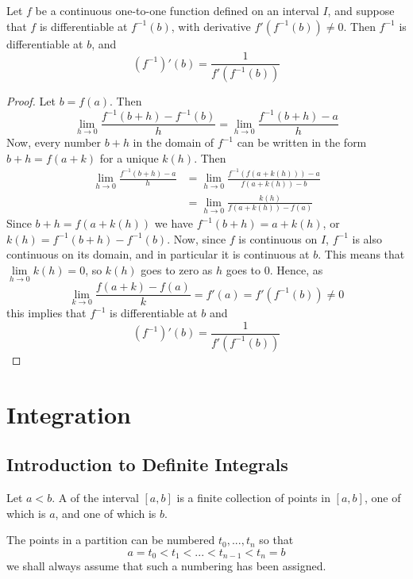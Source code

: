 \documentclass[12pt, a4paper, oneside, openright, titlepage]{book}
\begin{document}
\begin{thm}
    Let $f$ be a continuous one-to-one function defined on an interval $I$, and suppose that $f$ is differentiable at $f^{-1}(b)$, with derivative $f'(f^{-1}(b)) \neq 0$. Then $f^{-1}$ is differentiable at $b$, and \begin{equation}
        (f^{-1})'(b) = \frac{1}{f'(f^{-1}(b))}
    \end{equation}
\end{thm}
\begin{proof}
    Let $b = f(a)$. Then \begin{equation*}
        \lim\limits_{h\rightarrow 0}\frac{f^{-1}(b+h)-f^{-1}(b)}{h} = \lim\limits_{h\rightarrow 0}\frac{f^{-1}(b+h) - a}{h}
    \end{equation*}
    Now, every number $b+h$ in the domain of $f^{-1}$ can be written in the form $b+h = f(a+k)$ for a unique $k(h)$. Then \begin{align*}
        \lim\limits_{h\rightarrow 0}\frac{f^{-1}(b+h) - a}{h} &= \lim\limits_{h\rightarrow 0}\frac{f^{-1}(f(a+k(h)))-a}{f(a+k(h))-b} \\
        &= \lim\limits_{h\rightarrow 0}\frac{k(h)}{f(a+k(h))-f(a)}
    \end{align*}
    Since $b+h = f(a+k(h))$ we have $f^{-1}(b+h) = a+k(h)$, or $k(h) = f^{-1}(b+h)-f^{-1}(b)$. Now, since $f$ is continuous on $I$, $f^{-1}$ is also continuous on its domain, and in particular it is continuous at $b$. This means that $\lim\limits_{h\rightarrow 0}k(h) = 0$, so $k(h)$ goes to zero as $h$ goes to $0$. Hence, as $$\lim\limits_{k\rightarrow 0}\frac{f(a+k)-f(a)}{k} = f'(a) = f'(f^{-1}(b)) \neq 0$$ this implies that $f^{-1}$ is differentiable at $b$ and \begin{equation*}
        (f^{-1})'(b) = \frac{1}{f'(f^{-1}(b))}
    \end{equation*}
\end{proof}






\chapter{Integration}

\section{Introduction to Definite Integrals}

\begin{defn}
    Let $a < b$. A  of the interval $[a,b]$ is a finite collection of points in $[a,b]$, one of which is $a$, and one of        which is $b$.
\end{defn}
The points in a partition can be numbered $t_0,...,t_n$ so that \begin{equation}
    a = t_0 < t_1 < ... < t_{n-1} < t_n = b
\end{equation}
we shall always assume that such a numbering has been assigned.
\end{document}

